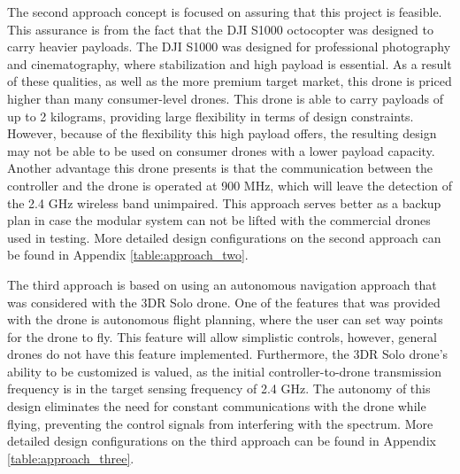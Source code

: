 The second approach concept is focused on assuring that this project is feasible. This assurance is from the fact that the DJI S1000 octocopter was designed to carry heavier payloads. The DJI S1000 was designed for professional photography and cinematography, where stabilization and high payload is essential. As a result  of these qualities, as well as the more premium target market, this drone is priced higher than many consumer-level drones. This drone is able to carry payloads of up to 2 kilograms, providing large flexibility in terms of design constraints. However, because of the flexibility this high payload offers, the resulting design may not be able to be used on consumer drones with a lower payload capacity. Another advantage this drone presents is that the communication between the controller and the drone is operated at 900 MHz, which will leave the detection of the 2.4 GHz wireless band unimpaired. This approach serves better as a backup plan in case the modular system can not be lifted with the commercial drones used in testing. More detailed design configurations on the second approach can be found in Appendix \ref{table:approach_two}. \par
The third approach is based on using an autonomous navigation approach that was considered with the 3DR Solo drone. One of the features that was provided with the drone is autonomous flight planning, where the user can set way points for the drone to fly. This feature will allow simplistic controls, however, general drones do not have this feature implemented. Furthermore, the 3DR Solo drone’s ability to be customized is valued, as the initial controller-to-drone transmission frequency is in the target sensing frequency of 2.4 GHz. The autonomy of this design eliminates the need for constant communications with the drone while flying, preventing the control signals from interfering with the spectrum. More detailed design configurations on the third approach can be found in Appendix \ref{table:approach_three}. \par

